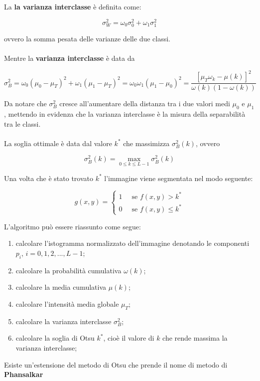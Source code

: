 La \textbf{la varianza interclasse} è definita come:

$$\sigma^2_W = \omega_0 \sigma^2_0 + \omega_1 \sigma^2_1
$$

ovvero la somma pesata delle varianze delle due classi.
\\\\Mentre la \textbf{varianza interclasse} è data da

$$
    \sigma^2_B = \omega_0(\mu_0 - \mu_T)^2 + \omega_1(\mu_1 - \mu_T)^2 = \omega_0\omega_1(\mu_1-\mu_0)^2 = \frac{\left[\mu_T \omega_k - \mu(k)\right]^2}{\omega(k)(1-\omega(k))}
$$

Da notare che $\sigma^2_B$  cresce all'aumentare della distanza tra i due valori medi $\mu_0$ e $\mu_1$, mettendo in evidenza che la varianza interclasse è la misura della separabilità tra le classi.
\\\\
La soglia ottimale è data dal valore $k^*$ che massimizza $\sigma^2_B(k)$, ovvero

$$
    \sigma^2_B(k) = \max_{0\le k \le L-1} \sigma^2_B(k)
$$

Una volta che è stato trovato $k^*$ l'immagine viene segmentata nel modo seguente:

$$
    g(x,y) = \begin{cases}
        1 & \ \text{ se } f(x,y) > k^*   \\
        0 & \ \text{ se } f(x,y) \le k^*
    \end{cases}
$$

L'algoritmo può essere riassunto come segue:

\begin{enumerate}
    \item calcolare l'istogramma normalizzato dell'immagine denotando le componenti $p_i$, $i=0,1,2,...,L-1$;
    \item calcolare la probabilità cumulativa $\omega(k)$;
    \item calcolare la media cumulativa $\mu(k)$;
    \item calcolare l'intensità media globale $\mu_T$;
    \item calcolare la varianza interclasse $\sigma^2_B$;
    \item  calcolare la soglia di Otsu $k^*$, cioè il valore di $k$ che rende massima la varianza interclasse;
\end{enumerate}

Esiste un'estensione del metodo di Otsu che prende il nome di metodo di \textbf{Phansalkar}


